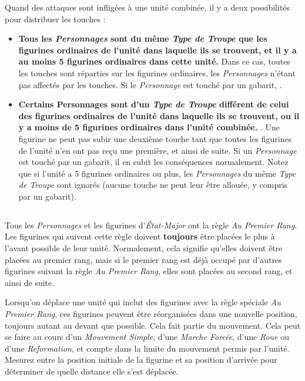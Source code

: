 Quand des attaques sont infligées à une unité combinée, il y a deux possibilités pour distribuer les touches :
\begin{itemize}[label={-}]
\item \textbf{Tous les \emph{Personnages} sont du même \emph{Type de Troupe} que les figurines ordinaires de l'unité dans laquelle ils se trouvent, et il y a au moins 5 figurines ordinaires dans cette unité.} Dans ce cas, toutes les touches sont réparties sur les figurines ordinaires, les \emph{Personnages} n'étant pas affectés par les touches. Si le \emph{Personnage} est touché par un gabarit, .
\item \textbf{Certains Personnages sont d'un \emph{Type de Troupe} différent de celui des figurines ordinaires de l'unité dans laquelle ils se trouvent, ou il y a moins de 5 figurines ordinaires dans l'unité combinée.} . Une figurine ne peut pas subir une deuxième touche tant que toutes les figurines de l'unité n'en ont pas reçu une première, et ainsi de suite. Si un \emph{Personnage} est touché par un gabarit, il en subit les conséquences normalement. Notez que si l'unité a 5 figurines ordinaires ou plus, les \emph{Personnages} du même \emph{Type de Troupe} sont ignorés (aucune touche ne peut leur être allouée, y compris par un gabarit).
\end{itemize}

\subsection{}
\label{au_premier_rang}

Tous les \emph{Personnages} et les figurines d'\emph{État-Major} ont la règle \emph{Au Premier Rang}. Les figurines qui suivent cette règle doivent \textbf{toujours} être placées le plus à l'avant possible de leur unité. Normalement, cela signifie qu'elles doivent être placées au premier rang, mais si le premier rang est déjà occupé par d'autres figurines suivant la règle \emph{Au Premier Rang}, elles sont placées au second rang, et ainsi de suite.

Lorsqu'on déplace une unité qui inclut des figurines avec la règle spéciale \emph{Au Premier Rang}, ces figurines peuvent être réorganisées dans une nouvelle position, toujours autant au devant que possible. Cela fait partie du mouvement. Cela peut se faire au cours d'un \emph{Mouvement Simple}, d'une \emph{Marche Forcée}, d'une \emph{Roue} ou d'une \emph{Reformation}, et compte dans la limite du mouvement permis par l'unité. Mesurez entre la position initiale de la figurine et sa position d'arrivée pour déterminer de quelle distance elle s'est déplacée.


